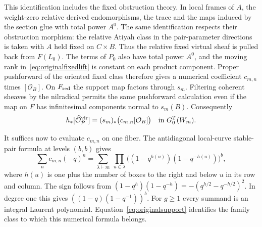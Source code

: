 This identification includes the fixed obstruction theory. In local
frames of \(A\), the weight-zero relative derived endomorphisms, the
trace and the maps induced by the section glue with total power
\(A^0\). The same identification respects their obstruction morphism:
the relative Atiyah class in the pair-parameter directions is taken
with \(A\) held fixed on \(C\times B\).
Thus the relative fixed virtual sheaf is pulled back from \(F(L_0)\).
The terms of \(P_0\) also have total power \(A^0\), and the moving
rank in~\eqref{eq:originalfixedlift} is constant on each product
component. Proper pushforward of the oriented fixed class therefore
gives a numerical coefficient \(c_{m,n}\) times \([\mathcal O_B]\).
On \(F_{\rm red}\) the support map factors through \(s_m\). Filtering
coherent sheaves by the nilradical permits the same pushforward
calculation even if the map on \(F\) has infinitesimal components
normal to \(s_m(B)\). Consequently
\begin{equation}
  h_*[\widehat{\mathcal O}_{\mathcal P}^{\rm vir}]
     =(s_m)_*\bigl(c_{m,n}[\mathcal O_B]\bigr)
     \quad\text{in }G_0^T(W_m).
 \label{eq:originalsupport}
\end{equation}

It suffices now to evaluate \(c_{m,n}\) on one fiber. The antidiagonal
local-curve stable-pair formula at levels \((b,b)\)
gives~\cite{monavari,refined}
\begin{equation}
 \sum_n c_{m,n}(-q)^n
   =\sum_{\lambda\vdash m}\ \prod_{u\in\lambda}
     \bigl((1-q^{h(u)})(1-q^{-h(u)})\bigr)^b ,
 \label{eq:originalhook}
\end{equation}
where \(h(u)\) is one plus the number of boxes to the right and below
\(u\) in its row and column. The sign follows from
\((1-q^h)(1-q^{-h})=-(q^{h/2}-q^{-h/2})^2\). In degree one this
gives \(((1-q)(1-q^{-1}))^b\). For \(g\geq1\) every summand is an
integral Laurent polynomial. Equation~\eqref{eq:originalsupport}
identifies the family class to which this numerical formula belongs.
